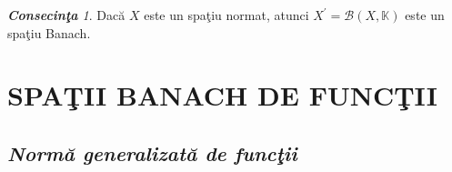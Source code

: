 \documentclass[ a4paper, 12pt]{report}
\theoremstyle{definition}
\theoremstyle{remark}
\newtheorem{cons}{\bf Consecin\c ta }[section]
\numberwithin{equation}{section}
\begin{document}
\begin{cons}
Dac\u a $X$ este un spa\c tiu normat, atunci $X^{'} = \mathcal{B}(X,\mathbb{K})$ este un spa\c tiu Banach.
\end{cons}








\newpage
\chapter{SPA\c TII BANACH DE FUNC\c TII}
\vspace{5mm}

\section{\textit{Norm\u a generalizat\u a de func\c tii}}
\end{document}
